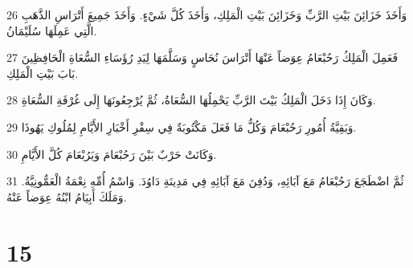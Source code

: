 \par 26 وَأَخَذَ خَزَائِنَ بَيْتِ الرَّبِّ وَخَزَائِنَ بَيْتِ الْمَلِكِ، وَأَخَذَ كُلَّ شَيْءٍ. وَأَخَذَ جَمِيعَ أَتْرَاسِ الذَّهَبِ الَّتِي عَمِلَهَا سُلَيْمَانُ.
\par 27 فَعَمِلَ الْمَلِكُ رَحُبْعَامُ عِوَضاً عَنْهَا أَتْرَاسَ نُحَاسٍ وَسَلَّمَهَا لِيَدِ رُؤَسَاءِ السُّعَاةِ الْحَافِظِينَ بَابَ بَيْتِ الْمَلِكِ.
\par 28 وَكَانَ إِذَا دَخَلَ الْمَلِكُ بَيْتَ الرَّبِّ يَحْمِلُهَا السُّعَاةُ، ثُمَّ يُرْجِعُونَهَا إِلَى غُرْفَةِ السُّعَاةِ.
\par 29 وَبَقِيَّةُ أُمُورِ رَحُبْعَامَ وَكُلُّ مَا فَعَلَ مَكْتُوبَةٌ فِي سِفْرِ أَخْبَارِ الأَيَّامِ لِمُلُوكِ يَهُوذَا.
\par 30 وَكَانَتْ حَرْبٌ بَيْنَ رَحُبْعَامَ وَيَرُبْعَامَ كُلَّ الأَيَّامِ.
\par 31 ثُمَّ اضْطَجَعَ رَحُبْعَامُ مَعَ آبَائِهِ، وَدُفِنَ مَعَ آبَائِهِ فِي مَدِينَةِ دَاوُدَ. وَاسْمُ أُمِّهِ نِعْمَةُ الْعَمُّونِيَّةُ. وَمَلَكَ أَبِيَامُ ابْنُهُ عِوَضاً عَنْهُ.

\chapter{15}


